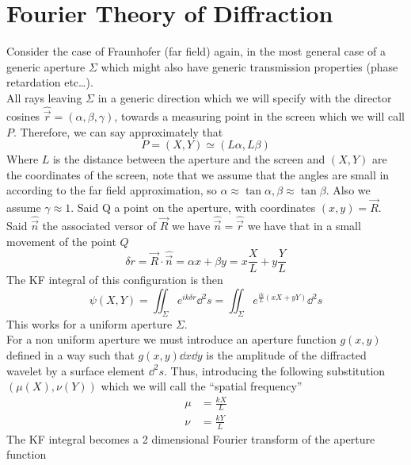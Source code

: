 \documentclass[../electromagnetism.tex]{subfiles}
\begin{document}
\section{Fourier Theory of Diffraction}
Consider the case of Fraunhofer (far field) again, in the most general case of a generic aperture $\Sigma$ which might also have generic transmission properties (phase retardation etc\ldots).\\
All rays leaving $\Sigma$ in a generic direction which we will specify with the director cosines $\hat{\vec{r}}=(\alpha, \beta, \gamma)$, towards a measuring point in the screen which we will call $P$. Therefore, we can say approximately that
\begin{equation*}
	P=\left( X, Y \right)\simeq\left( L\alpha, L\beta \right)
\end{equation*}
Where $L$ is the distance between the aperture and the screen and $(X, Y)$ are the coordinates of the screen, note that we assume that the angles are small in according to the far field approximation, so $\alpha\approx\tan\alpha, \beta\approx\tan\beta$. Also we assume $\gamma\approx1$. Said Q a point on the aperture, with coordinates $(x, y)=\vec{R}$. Said $\hat{\vec{n}}$ the associated versor of $\vec{R}$ we have $\hat{\vec{n}}=\hat{\vec{r}}$ we have that in a small movement of the point $Q$
\begin{equation*}
	\delta r=\vec{R}\cdot\hat{\vec{n}}=\alpha x+\beta y=x\frac{X}{L}+y\frac{Y}{L}
\end{equation*}
The KF integral of this configuration is then
\begin{equation}
	\psi\left( X, Y \right)=\iint_\Sigma e^{ik\delta r}\dd^2s=\iint_\Sigma e^{\frac{ik}{L}\left( xX+yY \right)}\dd^2s
	\label{eq:kf.fdiff}
\end{equation}
This works for a uniform aperture $\Sigma$.\\
For a non uniform aperture we must introduce an aperture function $g(x, y)$ defined in a way such that $g(x, y)\dd x\dd y$ is the amplitude of the diffracted wavelet by a surface element $\dd^2s$. Thus, introducing the following substitution $(\mu(X), \nu(Y))$ which we will call the ``spatial frequency''
\begin{equation}
	\begin{aligned}
		\mu&= \frac{kX}{L}\\
		\nu&= \frac{kY}{L}
	\end{aligned}
	\label{eq:spatfreq.fourier}
\end{equation}
The KF integral becomes a 2 dimensional Fourier transform of the aperture function
\end{document}
